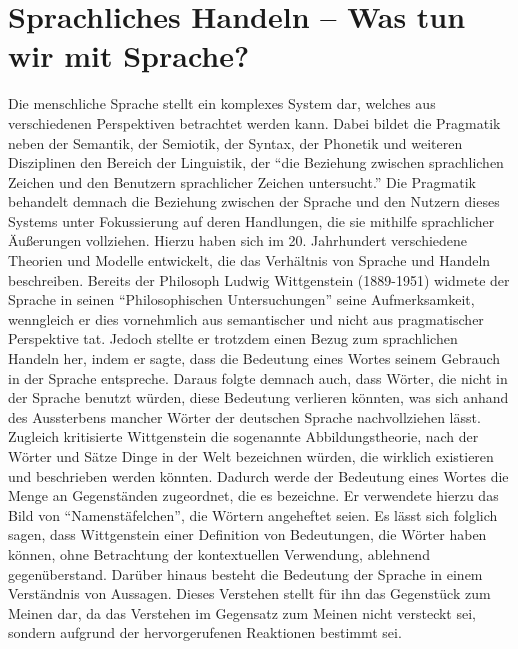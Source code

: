 \section{Sprachliches Handeln – Was tun wir mit Sprache?}
Die menschliche Sprache stellt ein komplexes System dar, welches aus verschiedenen Perspektiven betrachtet werden kann.
Dabei bildet die Pragmatik neben der Semantik, der Semiotik, der Syntax, der Phonetik und weiteren Disziplinen den Bereich der Linguistik, der "`die Beziehung zwischen sprachlichen Zeichen und den Benutzern sprachlicher Zeichen untersucht."'
Die Pragmatik behandelt demnach die Beziehung zwischen der Sprache und den Nutzern dieses Systems unter Fokussierung auf deren Handlungen, die sie mithilfe sprachlicher Äußerungen vollziehen.
Hierzu haben sich im 20. Jahrhundert verschiedene Theorien und Modelle entwickelt, die das Verhältnis von Sprache und Handeln beschreiben.
Bereits der Philosoph Ludwig Wittgenstein (1889-1951) widmete der Sprache in seinen "`Philosophischen Untersuchungen"' seine Aufmerksamkeit, wenngleich er dies vornehmlich aus semantischer und nicht aus pragmatischer Perspektive tat.
Jedoch stellte er trotzdem einen Bezug zum sprachlichen Handeln her, indem er sagte, dass die Bedeutung eines Wortes seinem Gebrauch in der Sprache entspreche.
Daraus folgte demnach auch, dass Wörter, die nicht in der Sprache benutzt würden, diese Bedeutung verlieren könnten, was sich anhand des Aussterbens mancher Wörter der deutschen Sprache nachvollziehen lässt.
Zugleich kritisierte Wittgenstein die sogenannte Abbildungstheorie, nach der Wörter und Sätze Dinge in der Welt bezeichnen würden, die wirklich existieren und beschrieben werden könnten.
Dadurch werde der Bedeutung eines Wortes die Menge an Gegenständen zugeordnet, die es bezeichne.
Er verwendete hierzu das Bild von "`Namenstäfelchen"', die Wörtern angeheftet seien.
Es lässt sich folglich sagen, dass Wittgenstein einer Definition von Bedeutungen, die Wörter haben können, ohne Betrachtung der kontextuellen Verwendung, ablehnend gegenüberstand.
Darüber hinaus besteht die Bedeutung der Sprache in einem Verständnis von Aussagen.
Dieses Verstehen stellt für ihn das Gegenstück zum Meinen dar, da das Verstehen im Gegensatz zum Meinen nicht versteckt sei, sondern aufgrund der hervorgerufenen Reaktionen bestimmt sei.

